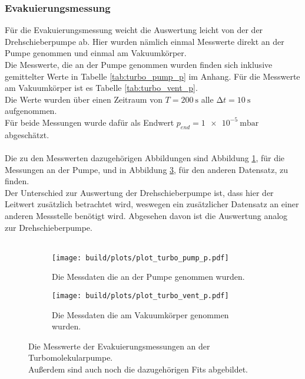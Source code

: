         \subsubsection{Evakuierungsmessung}

        \noindent
        Für die Evakuierungsmessung weicht die Auswertung leicht von der der Drehschieberpumpe ab. 
        Hier wurden nämlich einmal Messwerte direkt an der Pumpe genommen und einmal am Vakuumkörper. \\
        Die Messwerte, die an der Pumpe genommen wurden finden sich inklusive gemittelter Werte in Tabelle \ref{tab:turbo_pump_p} im Anhang. 
        Für die Messwerte am Vakuumkörper ist es Tabelle \ref{tab:turbo_vent_p}. \\
        Die Werte wurden über einen Zeitraum von $ T = \SI{200}{\second}$ alle $ \increment t = \SI{10}{\second}$ aufgenommen.\\
        Für beide Messungen wurde dafür als Endwert $p_{end} = \SI{1e-5}{\milli\bar}$ abgeschätzt.\\\\
        Die zu den Messwerten dazugehörigen Abbildungen sind Abbildung \ref{img:turbo_pump_p}, 
        für die Messungen an der Pumpe, und in Abbildung \ref{img:turbo_vent_p}, für den anderen Datensatz, zu finden.\\
        Der Unterschied zur Auswertung der Drehschieberpumpe ist, dass hier der Leitwert zusätzlich betrachtet wird, 
        weswegen ein zusätzlicher Datensatz an einer anderen Messstelle benötigt wird.
        Abgesehen davon ist die Auswertung analog zur Drehschieberpumpe.\\\\
        \begin{figure}[H]
          \begin{subfigure}{0.46\textwidth}
                  \centering
                  \texttt{[image: build/plots/plot\_turbo\_pump\_p.pdf]}
                  \label{img:turbo_pump_p}
                  \caption{Die Messdaten die an der Pumpe genommen wurden.}
          \end{subfigure}
          \hfill
          \begin{subfigure}{0.46\textwidth}
                  \centering
                  \texttt{[image: build/plots/plot\_turbo\_vent\_p.pdf]}
                  \label{img:turbo_vent_p}
                  \caption{Die Messdaten die am Vakuumkörper genommen wurden.}
          \end{subfigure}
          \caption{Die Messwerte der Evakuierungsmessungen an der Turbomolekularpumpe.\\
          Außerdem sind auch noch die dazugehörigen Fits abgebildet. }
      \end{figure}
